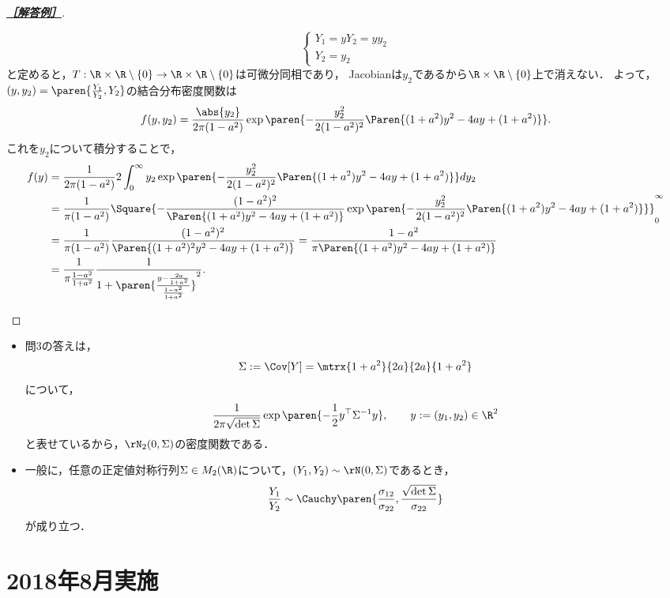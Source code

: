 \documentclass[uplatex,dvipdfmx]{jsarticle}
\begin{document}
\begin{proof}[\textbf{\underline{［解答例］}}]
\begin{enumerate}
\[\begin{cases}
            Y_1=yY_2=yy_2\\
            Y_2=y_2
        \end{cases}\]
        と定めると，$T:\R\times\R\setminus\{0\}\to\R\times\R\setminus\{0\}$は可微分同相であり，
        Jacobianは$y_2$であるから$\R\times\R\setminus\{0\}$上で消えない．
        よって，
        $(y,y_2)=\paren{\frac{Y_1}{Y_2},Y_2}$の結合分布密度関数は
        \[f(y,y_2)=\frac{\abs{y_2}}{2\pi(1-a^2)}\exp\paren{-\frac{y^2_2}{2(1-a^2)^2}\Paren{(1+a^2)y^2-4ay+(1+a^2)}}.\]
        これを$y_2$について積分することで，
        \begin{align*}
            f(y)&=\frac{1}{2\pi(1-a^2)}2\int^\infty_0y_2\exp\paren{-\frac{y^2_2}{2(1-a^2)^2}\Paren{(1+a^2)y^2-4ay+(1+a^2)}}dy_2\\
            &=\frac{1}{\pi(1-a^2)}\Square{-\frac{(1-a^2)^2}{\Paren{(1+a^2)y^2-4ay+(1+a^2)}}\exp\paren{-\frac{y^2_2}{2(1-a^2)^2}\Paren{(1+a^2)y^2-4ay+(1+a^2)}}}^\infty_0\\
            &=\frac{1}{\pi(1-a^2)}\frac{(1-a^2)^2}{\Paren{(1+a^2)^2y^2-4ay+(1+a^2)}}=\frac{1-a^2}{\pi\Paren{(1+a^2)y^2-4ay+(1+a^2)}}\\
            &=\frac{1}{\pi\frac{1-a^2}{1+a^2}}\frac{1}{1+\paren{\frac{y-\frac{2a}{1+a^2}}{\frac{1-a^2}{1+a^2}}}^2}.
        \end{align*}
    \end{enumerate}
\end{proof}
\begin{remark*}\mbox{}
    \begin{itemize}
        \item 問3の答えは，
        \[\Sigma:=\Cov[Y]=\mtrx{1+a^2}{2a}{2a}{1+a^2}\]
        について，
        \[\frac{1}{2\pi\sqrt{\det\Sigma}}\exp\paren{-\frac{1}{2}y^\top\Sigma^{-1}y},\qquad y:=(y_1,y_2)\in\R^2\]
        と表せているから，$\rN_2(0,\Sigma)$の密度関数である．
        \item 一般に，任意の正定値対称行列$\Sigma\in M_2(\R)$について，$(Y_1,Y_2)\sim\rN(0,\Sigma)$であるとき，
        \[\frac{Y_1}{Y_2}\sim\Cauchy\paren{\frac{\sigma_{12}}{\sigma_{22}},\frac{\sqrt{\det\Sigma}}{\sigma_{22}}}\]
        が成り立つ．
    \end{itemize}
\end{remark*}

\section{2018年8月実施}
\end{document}
